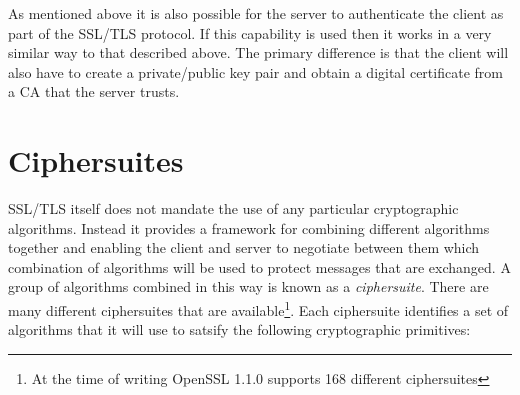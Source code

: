 As mentioned above it is also possible for the server to authenticate the 
client as part of the SSL/TLS protocol. If this capability is used then it works
in a very similar way  to that described above. The primary difference is that
the client will also have to create a private/public key pair and obtain a
digital certificate from a CA that the server trusts. 

\section{Ciphersuites}

SSL/TLS itself does not mandate the use of any particular cryptographic 
algorithms. Instead it provides a framework for combining different algorithms 
together and enabling the client and server to negotiate between them which 
combination of algorithms will be used to protect messages that are exchanged. 
A group of algorithms combined in this way is known as a \emph{ciphersuite}. 
There are many different ciphersuites that are available\footnote{At the time 
of writing OpenSSL 1.1.0 supports 168 different ciphersuites}. Each
ciphersuite identifies a set of algorithms that it will use to satsify the 
following cryptographic primitives:
